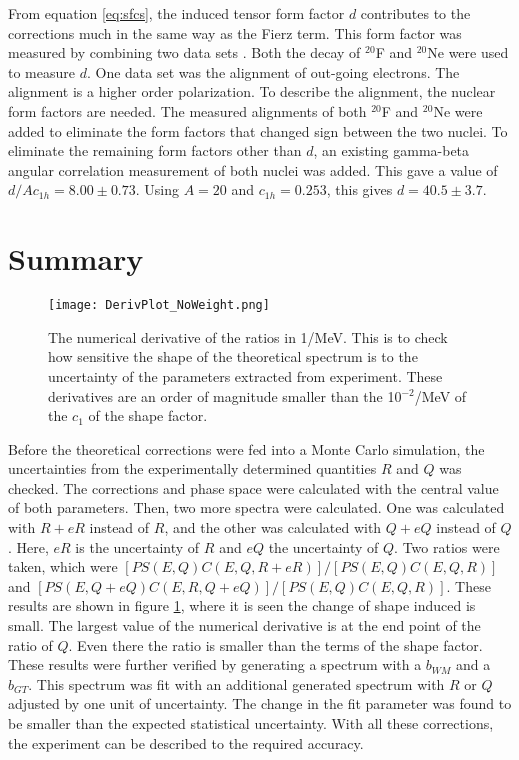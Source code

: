 \documentclass[../MaxHughesThesis.tex]{subfiles}
\begin{document}
From equation \ref{eq:sfcs}, the induced tensor form factor $d$ contributes to the corrections much in the same way as the Fierz term.
This form factor was measured by combining two data sets \cite{Min11}.
Both the decay of $^{20}$F and $^{20}$Ne were used to measure $d$.
One data set was the alignment of out-going electrons.
The alignment is a higher order polarization.
To describe the alignment, the nuclear form factors are needed.  
The measured alignments of both $^{20}$F and $^{20}$Ne were added to eliminate the form factors that changed sign between the two nuclei.
To eliminate the remaining form factors other than $d$, an existing gamma-beta angular correlation measurement of both nuclei was added. 
This gave a value of $d/Ac_{1h} = 8.00 \pm 0.73$.
Using $A = 20$ and $c_{1h} = 0.253$, this gives $d = 40.5 \pm 3.7$. 

\section{Summary}

\begin{figure}[!htb]
	\centerline{\texttt{[image: DerivPlot\_NoWeight.png]}}
	\caption{The numerical derivative of the ratios in 1/MeV.
		 This is to check how sensitive the shape of the theoretical spectrum is to the uncertainty of the parameters extracted from experiment. 
		 These derivatives are an order of magnitude smaller than the 10$^{-2}$/MeV of the $c_{1}$ of the shape factor.}
	\label{fig:theoryuncer}
\end{figure}

Before the theoretical corrections were fed into a Monte Carlo simulation, the uncertainties from the experimentally determined quantities $R$ and $Q$ was checked.
The corrections and phase space were calculated with the central value of both parameters.
Then, two more spectra were calculated.
One was calculated with $R + eR$ instead of $R$, and the other was calculated with $Q + eQ$ instead of $Q$.
Here, $eR$ is the uncertainty of $R$ and $eQ$ the uncertainty of $Q$.
Two ratios were taken, which were $[PS(E,Q)C(E,Q,R+eR)]/[PS(E,Q)C(E,Q,R)]$ and $[PS(E,Q+eQ)C(E,R,Q+eQ)]/[PS(E,Q)C(E,Q,R)]$.
These results are shown in figure \ref{fig:theoryuncer}, where it is seen the change of shape induced is small.
The largest value of the numerical derivative is at the end point of the ratio of  $Q$. 
Even there the ratio is smaller than the terms of the shape factor.
These results were further verified by generating a spectrum with a $b_{WM}$ and a $b_{GT}$.
This spectrum was fit with an additional generated spectrum with $R$ or $Q$ adjusted by one unit of uncertainty.
The change in the fit parameter was found to be smaller than the expected statistical uncertainty.
With all these corrections, the experiment can be described to the required accuracy.
\end{document}
